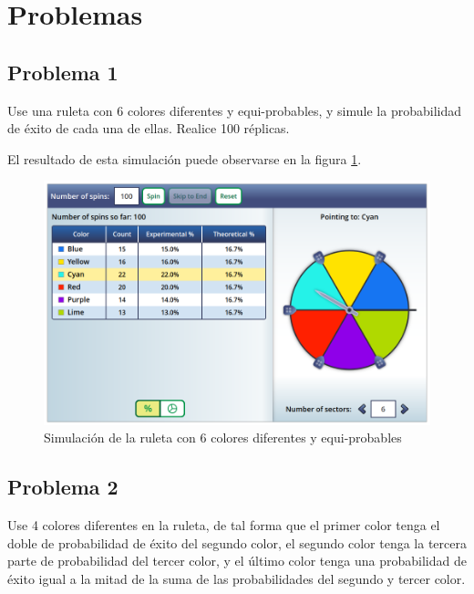 \documentclass{article}
\begin{document}
    \section*{Problemas}

        \subsection*{Problema 1}
            Use una ruleta con 6 colores diferentes y equi-probables, y simule la probabilidad de éxito de cada una de ellas. Realice 100 réplicas.

            El resultado de esta simulación puede observarse en la figura \ref{fig:simulacion-ruleta-1}.

            \begin{figure}[!htbp]
                \centering
                \includegraphics[scale=0.3]{img/simulacion-ruleta-1.png}
                \caption{Simulación de la ruleta con 6 colores diferentes y equi-probables}
                \label{fig:simulacion-ruleta-1}
            \end{figure}

        \subsection*{Problema 2}

            Use 4 colores diferentes en la ruleta, de tal forma que el primer color tenga el doble de probabilidad de éxito del segundo color, el segundo color tenga la tercera parte de probabilidad del tercer color, y el último color tenga una probabilidad de éxito igual a la mitad de la suma de las probabilidades del segundo y tercer color.
            
\end{document}
